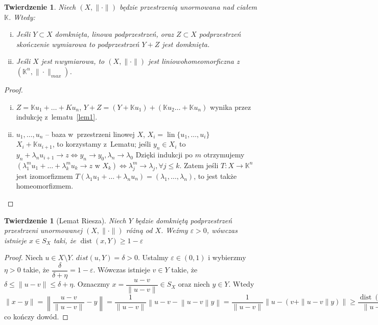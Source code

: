 \documentclass[11pt]{mwrep}
\renewcommand{\[}{\begin{equation}}
\renewcommand{\]}{\end{equation}}
\newcommand{\K}{\ensuremath{\mathbb{K}}}
\newcommand{\lin}{\operatorname{lin}}
\newcommand{\dist}{\operatorname{dist}}
\newtheorem{twr}[subsection]{Twierdzenie}%
\newcounter{numer}
\begin{document}
\begin{twr}
	Niech $(X,\|\cdot\|)$ będzie przestrzenią unormowana nad ciałem $\K$. Wtedy:
	\begin{enumerate}[(i)]
		\item Jeśli $Y\subset X$  domknięta, linowa podprzestrzeń, oraz  $Z\subset X$ podprzestrzeń skończenie wymiarowa to podprzestrzeń $Y+ Z$ jest domknięta.
		\item Jeśli $X$ jest $n$\dywiz wymiarowa, to $(X,\|\cdot\|)$ jest liniowo\dywiz homeomorficzna z~$(\K^n, \|\cdot\|_{max})$.			
	\end{enumerate}
\end{twr}
\begin{proof}
	\begin{enumerate}[(i)]
	  \item $Z= \K u_1 + \ldots + K u_n$, $Y+Z = (Y+\K u_1) +(\K u_2 \ldots + \K u_n)$ wynika przez indukcję z~lematu~\ref{lem1}.  
		\item $u_1 , \ldots, u_n$ -- baza w~przestrzeni linowej $X$, $X_i = \lin\{ u_1, \ldots, u_i\}$ \\
			$X_i+\K u_{i+1}$, to korzystamy z~Lematu; jeśli $y_n \in X_i$ to 
			$ y_n + \lambda_n u_{i+1}  \to z \Leftrightarrow y_n \to y_0, \lambda_n \to \lambda_0$
			Dzięki indukcji po $m$ otrzymujemy 
			$(\lambda_1^m u_1 + \ldots + \lambda_k^m u_k\to z \textrm{ w } X_k) \Leftrightarrow \lambda_j^m \to \lambda_j,\forall j \le k$.
			Zatem jeśli $T:X  \to \K^n$ jest izomorfizmem 
			$T\left( \lambda_1 u_1 + \ldots + \lambda_n u_n  \right) = \left( \lambda_1,\ldots,\lambda_n \right)$,
			to jest także homeomorfizmem.
	\end{enumerate}
\end{proof}
\begin{twr}[Lemat Riesza]
	Niech $Y$ będzie domkniętą podprzestrzeń przestrzeni unormowanej $(X,\|\cdot\|)$ różną od $X$. Weźmy $\varepsilon>0$, 
	wówczas istnieje $x\in S_X$ taki, że $\dist(x,Y)\ge 1 -\varepsilon$
\end{twr}
\begin{proof}
	Niech $u \in X\setminus Y$. $dist(u,Y) = \delta>0$. Ustalmy $\varepsilon\in (0,1)$ i wybierzmy $\eta>0$ takie, że 
	$\dfrac{\delta}{\delta+\eta}=1- \varepsilon$. Wówczas istnieje $v\in Y$ takie, że
	$\delta\le \|u-v\| \le \delta+\eta$.
	Oznaczmy $x= \dfrac{u-v}{\|u-v\|} \in S_X$ 
	oraz niech $y\in Y$. Wtedy $\|x-y\|= \left\|\dfrac{u-v}{\|u-v\|} - y\right\|= \dfrac{1}{\|u-v\|} \left\|u-v-\left\|u-v\right\|y\right\|= 
	\dfrac{1}{\|u-v\|} \left\|u- \left( v+ \|u-v\| y \right)\right\| \ge \dfrac{\dist(u,Y)}{\|u-v\|} \ge \dfrac{\delta}{\delta+\eta} = 1 -\varepsilon$ co kończy dowód.
\end{proof}
\end{document}
